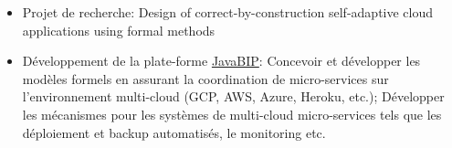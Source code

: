 \documentclass[10pt,a4paper,ragged2e]{altacv}
\begin{document}



\begin{fullwidth}
\makecvheader
\end{fullwidth}



\begin{itemize}
	\item Projet de recherche: Design of correct-by-construction self-adaptive cloud applications using formal methods
	
	\item Développement de la plate-forme \href{https://github.com/sbliudze/javabip-core}{JavaBIP}: Concevoir et développer les modèles formels en assurant la coordination de micro-services sur l'environnement multi-cloud (GCP, AWS, Azure, Heroku, etc.); Développer les mécanismes pour les systèmes de multi-cloud micro-services tels que les déploiement et backup automatisés, le monitoring etc.  
\end{itemize}
\end{document}

